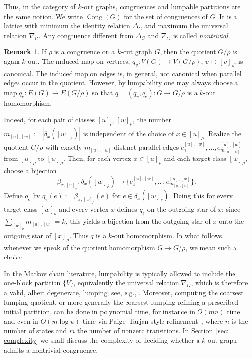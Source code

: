 \documentclass[a4paper,10pt]{amsart}
\theoremstyle{plain}
\theoremstyle{definition}
\newtheorem{remark}[theorem]{Remark}
\DeclareMathOperator{\Cong}{Cong}
\begin{document}
Thus, in the category of $k$-out graphs, congruences and lumpable partitions are the same notion. We write $\Cong(G)$ for the set of congruences of $G$. It is a lattice with minimum the identity relation $\Delta_G$ and maximum the universal relation $\nabla_G$. Any congruence different from $\Delta_G$ and $\nabla_G$ is called \emph{nontrivial}.

\begin{remark}\label{rem:quotient-homomorphism-choice}
If $\rho$ is a congruence on a $k$-out graph $G$, then the quotient $G/\rho$ is again $k$-out. The induced map on vertices, $q_v:V(G)\to V(G/\rho)$, $v\mapsto [v]_\rho$, is canonical. The induced map on edges is, in general, not canonical when parallel edges occur in the quotient. However, by lumpability one may always choose a map $q_e:E(G)\to E(G/\rho)$ so that $q=(q_v,q_e):G\to G/\rho$ is a $k$-out homomorphism.

Indeed, for each pair of classes $[u]_\rho,[w]_\rho$, the number $m_{[u],[w]}:=|\delta_x([w]_\rho)|$ is independent of the choice of $x\in [u]_\rho$. Realize the quotient $G/\rho$ with exactly $m_{[u],[w]}$ distinct parallel edges $e^{[u],[w]}_1,\dots,e^{[u],[w]}_{m_{[u],[w]}}$ from $[u]_\rho$ to $[w]_\rho$. Then, for each vertex $x\in [u]_\rho$ and each target class $[w]_\rho$, choose a bijection
\[
\beta_{x,[w]_\rho}:\delta_x([w]_\rho)\longrightarrow \{e^{[u],[w]}_1,\dots,e^{[u],[w]}_{m_{[u],[w]}}\}.
\]
Define $q_e$ by $q_e(e):=\beta_{x,[w]_\rho}(e)$ for $e\in \delta_x([w]_\rho)$. Doing this for every target class $[w]_\rho$ and every vertex $x$ defines $q_e$ on the outgoing star of $x$; since $\sum_{[w]_\rho} m_{[u],[w]}=k$, this yields a bijection from the outgoing star of $x$ onto the outgoing star of $[x]_\rho$. Thus $q$ is a $k$-out homomorphism. In what follows, whenever we speak of the quotient homomorphism $G\to G/\rho$, we mean such a choice.
\end{remark}

In the Markov chain literature, lumpability is typically allowed to include the one-block partition $\{V\}$, equivalently the universal relation $\nabla_G$, which is therefore a valid, albeit degenerate, lumping; see, e.g., \cite[\S6.3]{KemenySnellFMC}. Moreover, computing the coarsest lumping quotient, or more generally the coarsest lumping refining a prescribed initial partition, can be done in polynomial time, for instance in $O(mn)$ time~\cite{Buchholz1994} and even in $O(m\log n)$ time via Paige--Tarjan style refinement~\cite{DerisaviHermannsSanders2003}, where $n$ is the number of states and $m$ the number of nonzero transitions. In Section~\ref{sec: complexity} we shall discuss the complexity of deciding whether a $k$-out graph admits a nontrivial congruence.
\end{document}
